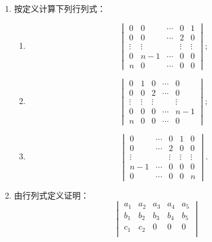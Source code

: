 \begin{enumerate}
\begin{enumerate}
  \anssub
    \item $\displaystyle\sum_{j_1j_2j_3j_4}(-1)^{\tau(j_1j_2j_3j_4)}a_{1j_1}a_{3j_2}a_{2j_3}a_{4j_4}$；
  \anssub
    \item $a_{31}A_{21}+a_{32}A_{22}+a_{33}A_{23}+a_{34}A_{24}$；
  \anssub
    \item $a_{13}A_{12}+a_{23}A_{22}+a_{33}A_{32}+a_{43}A_{42}$；
  \anssub
    \item $\displaystyle\sum_{j_1j_2j_3j_4}(-1)^{\tau(j_1j_2j_3j_4)}a_{j_1 1}b_{j_2 2}a_{j_3 3}a_{j_4 4}$，%
  \anssub
  \end{enumerate}
  \item 按定义计算下列行列式：
  \begin{enumerate}
    \item \[
    \begin{vmatrix}
      0&0&\cdots&0&1\\
      0&0&\cdots&2&0\\
      \vdots&\vdots&&\vdots&\vdots\\
      0&n-1&\cdots&0&0\\
      n&0&\cdots&0&0
    \end{vmatrix};
    \]
  \anssub
    \item \[
    \begin{vmatrix}
      0&1&0&\cdots&0\\
      0&0&2&\cdots&0\\
      \vdots&\vdots&\vdots&&\vdots\\
      0&0&0&\cdots&n-1\\
      n&0&0&\cdots&0
    \end{vmatrix};
    \]
  \anssub
    \item \[
    \begin{vmatrix}
      0&\cdots&0&1&0\\
      0&\cdots&2&0&0\\
      \vdots&&\vdots&\vdots&\vdots\\
      n-1&\cdots&0&0&0\\
      0&\cdots&0&0&n
    \end{vmatrix}.
    \]
  \anssub
  \end{enumerate}
  \item 由行列式定义证明：
  \[
    \begin{vmatrix}
      a_1&a_2&a_3&a_4&a_5\\
      b_1&b_2&b_3&b_4&b_5\\
      c_1&c_2&0&0&0\\

\end{vmatrix}\]
\end{enumerate}
